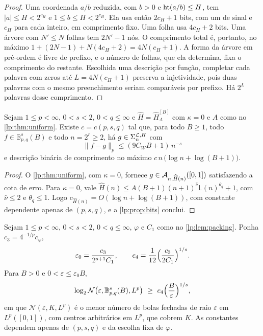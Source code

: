 \documentclass[12pt,a4paper]{article}
\begin{document}
\begin{proof}
Uma coordenada $a/b$ reduzida, com $b>0$ e $\operatorname{ht}(a/b)\le H$, tem $|a|\le H<2^{c_H}$ e $1\le b\le H<2^{c_H}$. Ela usa então $2c_H+1$ bits, com um de sinal e $c_H$ para cada inteiro, em comprimento fixo. Uma folha usa $4c_H+2$ bits. Uma árvore com $N'\le N$ folhas tem $2N'-1$ nós. O comprimento total é, portanto, no máximo $1+(2N-1)+N(4c_H+2)=4N(c_H+1)$. A forma da árvore em pré-ordem é livre de prefixo, e o número de folhas, que ela determina, fixa o comprimento do restante. Escolhida uma descrição por função, completar cada palavra com zeros até $L=4N(c_H+1)$ preserva a injetividade, pois duas palavras com o mesmo preenchimento seriam comparáveis por prefixo. Há $2^L$ palavras desse comprimento.
\end{proof}

\begin{corolario}
\label{lp:cor:bits}
Sejam $1\le p<\infty$, $0<s<2$, $0<q\le\infty$ e $\widehat H=\widehat H^{[B]}_{A}$ com $\kappa=0$ e $A$ como no \cref{lp:thm:uniform}. Existe $c=c(p,s,q)$ tal que, para todo $B\ge1$, todo $f\in\mathbb B^s_{p,q}(B)$ e todo $n=2^r\ge2$, há $g\in\Sigma_{n}^{\mathcal L,H}$ com
\[
 \|f-g\|_p\le(9C_WB+1)\,n^{-s}
\]
e descrição binária de comprimento no máximo $c\,n\,\bigl(\log n+\log(B+1)\bigr)$.
\end{corolario}

\begin{proof}
O \cref{lp:thm:uniform}, com $\kappa=0$, fornece $g\in\mathcal A_{n,\widehat H(n)}([0,1])$ satisfazendo a cota de erro. Para $\kappa=0$, vale $\widehat H(n)\le A(B+1)(n+1)^{\hat\nu}\mathsf L(n)^{\theta_q}+1$, com $\hat\nu\le2$ e $\theta_q\le1$. Logo $c_{\widehat H(n)}=O(\log n+\log(B+1))$, com constante dependente apenas de $(p,s,q)$, e a \cref{lp:prop:bits} conclui.
\end{proof}

\begin{proposicao}
\label{lp:prop:entropy-lower}
Sejam $1\le p<\infty$, $0<s<2$, $0<q\le\infty$, $\varphi$ e $C_1$ como no \cref{lp:lem:packing}. Ponha $c_3=4^{-1/p}c_\varphi$,
\[
\varepsilon_0=\frac{c_3}{2^{s+1}C_1},\qquad c_4=\frac1{12}\Bigl(\frac{c_3}{2C_1}\Bigr)^{1/s}.
\]
Para $B>0$ e $0<\varepsilon\le\varepsilon_0B$,
\[
\log_2\mathcal N\bigl(\varepsilon,\mathbb B^s_{p,q}(B),L^p\bigr)\ \ge\ c_4\Bigl(\frac B\varepsilon\Bigr)^{1/s},
\]
em que $\mathcal N(\varepsilon,K,L^p)$ é o menor número de bolas fechadas de raio $\varepsilon$ em $L^p([0,1])$, com centros arbitrários em $L^p$, que cobrem $K$. As constantes dependem apenas de $(p,s,q)$ e da escolha fixa de $\varphi$.
\end{proposicao}
\end{document}
